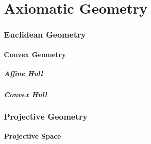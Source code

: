 \part{Axiomatic Geometry}\label{sec:axiomatic_geometry}

\section{Euclidean Geometry}\label{sec:euclidean_geometry}

\subsection{Convex Geometry}\label{sec:convex_geometry}

\subsubsection{Affine Hull}\label{sec:affine_hull}

\subsubsection{Convex Hull}\label{sec:convex_hull}



\section{Projective Geometry}\label{sec:projective_geometry}

\subsection{Projective Space}\label{sec:projective_space}

